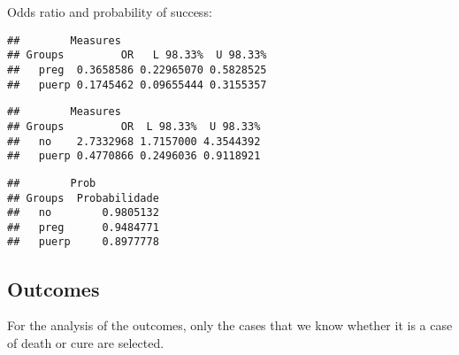 \documentclass[
]{article}
\newenvironment{Shaded}{\begin{snugshade}}{\end{snugshade}}
\newcommand{\CommentTok}[1]{\textcolor[rgb]{0.56,0.35,0.01}{\textit{#1}}}
\newcommand{\KeywordTok}[1]{\textcolor[rgb]{0.13,0.29,0.53}{\textbf{#1}}}
\newcommand{\NormalTok}[1]{#1}
\newcommand{\OperatorTok}[1]{\textcolor[rgb]{0.81,0.36,0.00}{\textbf{#1}}}
\begin{document}
Odds ratio and probability of success:

\begin{Shaded}
\end{Shaded}

\begin{verbatim}
##        Measures
## Groups         OR   L 98.33%  U 98.33%
##   preg  0.3658586 0.22965070 0.5828525
##   puerp 0.1745462 0.09655444 0.3155357
\end{verbatim}

\begin{Shaded}
\end{Shaded}

\begin{verbatim}
##        Measures
## Groups         OR  L 98.33%  U 98.33%
##   no    2.7332968 1.7157000 4.3544392
##   puerp 0.4770866 0.2496036 0.9118921
\end{verbatim}

\begin{Shaded}
\end{Shaded}

\begin{verbatim}
##        Prob
## Groups  Probabilidade
##   no        0.9805132
##   preg      0.9484771
##   puerp     0.8977778
\end{verbatim}

\hypertarget{outcomes}{%
\subsection{Outcomes}\label{outcomes}}

For the analysis of the outcomes, only the cases that we know whether it
is a case of death or cure are selected.
\end{document}
